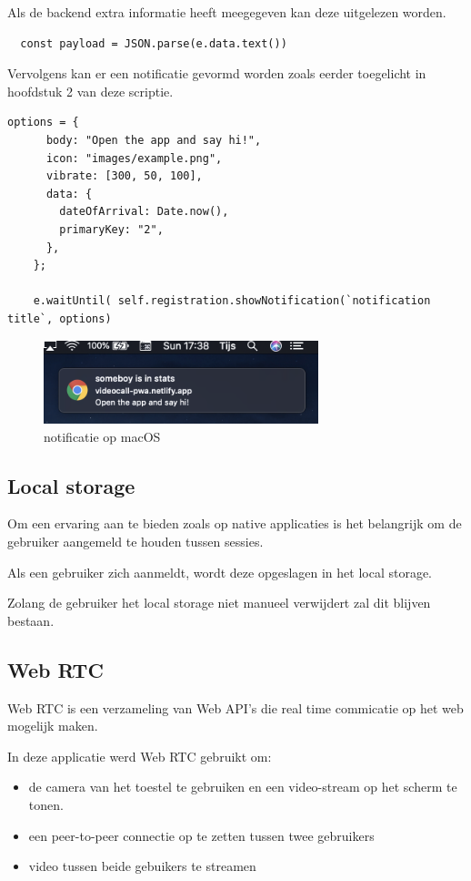 			Als de backend extra informatie heeft meegegeven kan deze uitgelezen worden.
\begin{lstlisting}
  const payload = JSON.parse(e.data.text())
\end{lstlisting}
			
			Vervolgens kan er een notificatie gevormd worden zoals eerder toegelicht in hoofdstuk 2 van deze scriptie.
			
\begin{lstlisting}
options = {
      body: "Open the app and say hi!",
      icon: "images/example.png",
      vibrate: [300, 50, 100],
      data: {
        dateOfArrival: Date.now(),
        primaryKey: "2",
      },
    };

    e.waitUntil( self.registration.showNotification(`notification title`, options)
\end{lstlisting}

	\begin{figure}[H]
		\centering
				\includegraphics[width=80mm]{./img/notificationMacOs}{}		
		\caption{notificatie op macOS}
	\end{figure}
			
	\subsection{Local storage}
		
		Om een ervaring aan te bieden zoals op native applicaties is het belangrijk om de gebruiker aangemeld te houden tussen sessies.
		
		Als een gebruiker zich aanmeldt, wordt deze opgeslagen in het local storage.
		
		Zolang de gebruiker het local storage niet manueel verwijdert zal dit blijven bestaan. 
		\autocite{Mozilla2020d}
		
	\subsection{Web RTC}
		
		Web RTC is een verzameling van Web API's die real time commicatie op het web mogelijk maken. 
		
		In deze applicatie werd Web RTC gebruikt om:
		\begin{itemize}
			\item de camera van het toestel te gebruiken en een video-stream op het scherm te tonen.
			\item een peer-to-peer connectie op te zetten tussen twee gebruikers
			\item video tussen beide gebuikers te streamen
		\end{itemize} 
		\autocite{webRTC2020}
		
